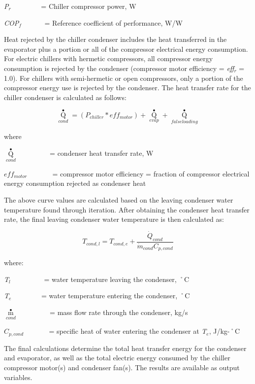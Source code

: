 \emph{P\(_{r}\)}~~~~~~~~ = Chiller compressor power, W

\emph{COP\(_{f}\)}~~~~~~ = Reference coefficient of performance, W/W

Heat rejected by the chiller condenser includes the heat transferred in the evaporator plus a portion or all of the compressor electrical energy consumption. For electric chillers with hermetic compressors, all compressor energy consumption is rejected by the condenser (compressor motor efficiency = \emph{eff\(_{r}\)} = 1.0). For chillers with semi-hermetic or open compressors, only a portion of the compressor energy use is rejected by the condenser. The heat transfer rate for the chiller condenser is calculated as follows:

\begin{equation}
{\mathop Q\limits^ \bullet_{cond}} = \left( {{P_{chiller}} * ef{f_{motor}}} \right) + {\mathop Q\limits^ \bullet_{evap}} + {\mathop Q\limits^ \bullet_{falseloading}}
\end{equation}

where

\({\mathop Q\limits^ \bullet_{cond}}\) ~~~~~~~~ = condenser heat transfer rate, W

\(ef{f_{motor}}\) ~~~~~~ = compressor motor efficiency = fraction of compressor electrical energy consumption rejected as condenser heat

The above curve values are calculated based on the leaving condenser water temperature found through iteration. After obtaining the condenser heat transfer rate, the final leaving condenser water temperature is then calculated as:

\begin{equation}
  T_{cond,l} = T_{cond,e} + \frac{\dot{Q}_{cond}}{\dot{m}_{cond} C_{p,cond}}
\end{equation}

where:

\emph{T\(_{l}\)}~~~~~~~~~ = water temperature leaving the condenser, ˚C

\emph{T\(_{e}\)}~~~~~~~~ = water temperature entering the condenser, ˚C

\({\mathop m\limits^ \bullet_{cond}}\) ~~~~~~~~ = mass flow rate through the condenser, kg/s

\({C_{p,cond}}\) ~~~~~~ = specific heat of water entering the condenser at \emph{T\(_{e}\)}, J/kg-˚C

The final calculations determine the total heat transfer energy for the condenser and evaporator, as well as the total electric energy consumed by the chiller compressor motor(s) and condenser fan(s). The results are available as output variables.


